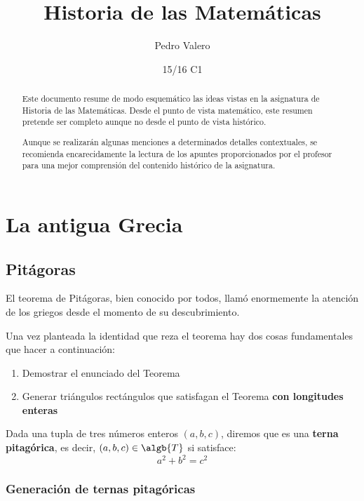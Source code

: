 \documentclass{apuntes}
\title{Historia de las Matemáticas}
\author{Pedro Valero}
\date{15/16 C1}
\begin{document}
\setcounter{tocdepth}{3}

\pagestyle{plain}

\begin{abstract}
Este documento resume de modo esquemático las ideas vistas en la asignatura de Historia de las Matemáticas. Desde el punto de vista matemático, este resumen pretende ser completo aunque no desde el punto de vista histórico.

Aunque se realizarán algunas menciones a determinados detalles contextuales, se recomienda encarecidamente la lectura de los apuntes proporcionados por el profesor para una mejor comprensión del contenido histórico de la asignatura.
\end{abstract}

\maketitle

\tableofcontents
\newpage

\chapter{La antigua Grecia}

\section{Pitágoras}
El teorema de Pitágoras, bien conocido por todos, llamó enormemente la atención de los griegos desde el momento de su descubrimiento.

Una vez planteada la identidad que reza el teorema hay dos cosas fundamentales que hacer a continuación:
\begin{enumerate}
\item Demostrar el enunciado del Teorema
\item Generar triángulos rectángulos que satisfagan el Teorema \textbf{con longitudes enteras}
\end{enumerate}


\begin{defn}
Dada una tupla de tres números enteros $(a,b,c)$, diremos que es una \textbf{terna pitagórica}, es decir, $(a,b,c) \in \algb{T}$ si satisface:
\[a^2+b^2=c^2\]
\end{defn}

\subsection{Generación de ternas pitagóricas}
\end{document}
